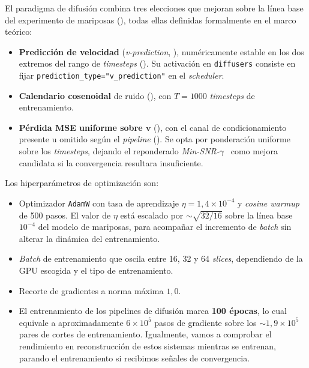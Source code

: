 El paradigma de difusión combina tres elecciones que mejoran sobre
la línea base del experimento de mariposas
(), todas ellas definidas formalmente
en el marco teórico:

\begin{itemize}[leftmargin=*]
    \item \textbf{Predicción de velocidad}
    (\textit{v-prediction}, ), numéricamente estable
    en los dos extremos del rango de \textit{timesteps}
    (). Su activación en
    \texttt{diffusers} consiste en fijar
    \texttt{prediction\_type="v\_prediction"} en el
    \textit{scheduler}.
    \item \textbf{Calendario cosenoidal} de ruido
    (), con $T = 1000$ \textit{timesteps}
    de entrenamiento.
    \item \textbf{Pérdida MSE uniforme sobre $\mathbf{v}$}
    (), con el canal de condicionamiento presente u
    omitido según el \textit{pipeline}
    (). Se opta por ponderación uniforme
    sobre los \textit{timesteps}, dejando el reponderado
    \textit{Min-SNR-$\gamma$}~\cite{hang2023minsnr} como mejora
    candidata si la convergencia resultara insuficiente.
\end{itemize}

Los hiperparámetros de optimización son:

\begin{itemize}[leftmargin=*]
    \item Optimizador \texttt{AdamW} con tasa de aprendizaje
    $\eta = 1{,}4 \times 10^{-4}$ y \textit{cosine warmup} de
    500 pasos. El valor de $\eta$ está escalado por
    $\sim\sqrt{32/16}$ sobre la línea base $10^{-4}$ del modelo de
    mariposas, para acompañar el incremento de \textit{batch} sin
    alterar la dinámica del entrenamiento.
    \item \textit{Batch} de entrenamiento que oscila entre 16, 32 y 64 \textit{slices}, dependiendo de la GPU 
    escogida y el tipo de entrenamiento. 
    \item Recorte de gradientes a norma máxima $1{,}0$.
    \item El entrenamiento de los pipelines de difusión marca \textbf{100 épocas}, lo cual equivale a
    aproximadamente $6 \times 10^{5}$ pasos de gradiente sobre los
    $\sim 1{,}9 \times 10^{5}$ pares de cortes de entrenamiento. Igualmente, vamos a comprobar el rendimiento
    en reconstrucción de estos sistemas mientras se entrenan, parando el entrenamiento si recibimos señales de convergencia.
\end{itemize}


